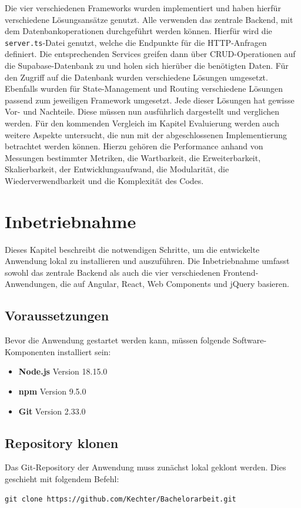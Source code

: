 \documentclass[oneside]{ausarbeitung}
\begin{document}
Die vier verschiedenen Frameworks wurden implementiert und haben hierfür verschiedene Lösungsansätze genutzt. Alle verwenden das zentrale Backend, mit dem Datenbankoperationen durchgeführt werden können. Hierfür wird die \texttt{server.ts}-Datei genutzt, welche die Endpunkte für die \ac{HTTP}-Anfragen definiert. Die entsprechenden Services greifen dann über \ac{CRUD}-Operationen auf die Supabase-Datenbank zu und holen sich hierüber die benötigten Daten. Für den Zugriff auf die Datenbank wurden verschiedene Lösungen umgesetzt. Ebenfalls wurden für State-Management und Routing verschiedene Lösungen passend zum jeweiligen Framework umgesetzt. Jede dieser Lösungen hat gewisse Vor- und Nachteile. Diese müssen nun ausführlich dargestellt und verglichen werden. Für den kommenden Vergleich im Kapitel Evaluierung werden auch weitere Aspekte untersucht, die nun mit der abgeschlossenen Implementierung betrachtet werden können. Hierzu gehören die Performance anhand von Messungen bestimmter Metriken, die Wartbarkeit, die Erweiterbarkeit, Skalierbarkeit, der Entwicklungsaufwand, die Modularität, die Wiederverwendbarkeit und die Komplexität des Codes.


\chapter{Inbetriebnahme}
Dieses Kapitel beschreibt die notwendigen Schritte, um die entwickelte Anwendung lokal zu installieren und auszuführen. Die Inbetriebnahme umfasst sowohl das zentrale Backend als auch die vier verschiedenen Frontend-Anwendungen, die auf Angular, React, Web Components und jQuery basieren.

\section{Voraussetzungen}
Bevor die Anwendung gestartet werden kann, müssen folgende Software-Komponenten installiert sein:
\begin{itemize}
    \item \textbf{Node.js} Version 18.15.0
    \item \textbf{npm} Version 9.5.0 
    \item \textbf{Git} Version 2.33.0
\end{itemize}

\section{Repository klonen}
Das Git-Repository der Anwendung muss zunächst lokal geklont werden. Dies geschieht mit folgendem Befehl:
\begin{verbatim}
git clone https://github.com/Kechter/Bachelorarbeit.git
\end{verbatim}
\end{document}
